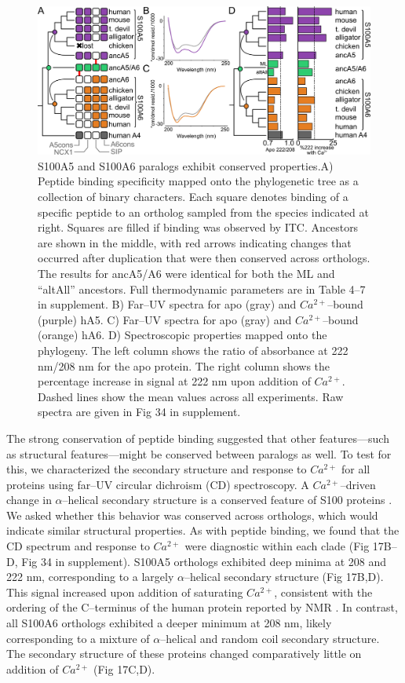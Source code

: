 \begin{figure}
\centering
	\includegraphics{ch5-fig4.png} 
\caption[S100A5 and S100A6 paralogs exhibit conserved properties]{S100A5 and S100A6 paralogs exhibit conserved properties.A) Peptide binding specificity mapped onto the phylogenetic tree as
a collection of binary characters. Each square denotes binding of
a specific peptide to an ortholog sampled from the species indicated
at right. Squares are filled if binding was observed by ITC. Ancestors
are shown in the middle, with red arrows indicating changes that occurred
after duplication that were then conserved across orthologs. The results
for ancA5/A6 were identical for both the ML and ``altAll'' ancestors.
Full thermodynamic parameters are in Table 4--7 in supplement. B) Far--UV spectra
for apo (gray) and $Ca^{2+}$--bound (purple) hA5. C) Far--UV spectra
for apo (gray) and $Ca^{2+}$--bound (orange) hA6. D) Spectroscopic
properties mapped onto the phylogeny. The left column shows the ratio
of absorbance at 222 nm/208 nm for the apo protein. The right column
shows the percentage increase in signal at 222 nm upon addition of
$Ca^{2+}$. Dashed lines show the mean values across all experiments.
Raw spectra are given in Fig 34 in supplement.\label{samplefigure}}	
\end{figure}

The strong conservation of peptide binding suggested that other features---such
as structural features---might be conserved between paralogs as well.
To test for this, we characterized the secondary structure and response
to $Ca^{2+}$ for all proteins using far--UV circular dichroism (CD)
spectroscopy. A $Ca^{2+}$--driven change in $\alpha$--helical secondary
structure is a conserved feature of S100 proteins \citep{wheeler_multiple_2016,marenholz_s100_2004}.
We asked whether this behavior was conserved across orthologs, which
would indicate similar structural properties. As with peptide binding,
we found that the CD spectrum and response to $Ca^{2+}$ were diagnostic
within each clade (Fig 17B--D, Fig 34 in supplement). S100A5 orthologs exhibited deep
minima at 208 and 222 nm, corresponding to a largely $\alpha$--helical
secondary structure (Fig 17B,D). This signal increased upon addition
of saturating $Ca^{2+}$, consistent with the ordering of the C--terminus
of the human protein reported by NMR \citep{bertini_solution_2009}.
In contrast, all S100A6 orthologs exhibited a deeper minimum at 208
nm, likely corresponding to a mixture of $\alpha$--helical and random
coil secondary structure. The secondary structure of these proteins
changed comparatively little on addition of $Ca^{2+}$ (Fig 17C,D). 

